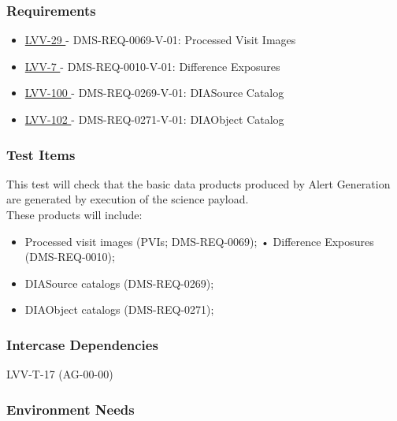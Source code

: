\subsubsection{Requirements}

\begin{itemize}

\item \href{https://jira.lsstcorp.org/browse/LVV-29}{ LVV-29 } - DMS-REQ-0069-V-01: Processed Visit Images

\item \href{https://jira.lsstcorp.org/browse/LVV-7}{ LVV-7 } - DMS-REQ-0010-V-01: Difference Exposures

\item \href{https://jira.lsstcorp.org/browse/LVV-100}{ LVV-100 } - DMS-REQ-0269-V-01: DIASource Catalog

\item \href{https://jira.lsstcorp.org/browse/LVV-102}{ LVV-102 } - DMS-REQ-0271-V-01: DIAObject Catalog

\end{itemize}


\subsubsection{Test Items}

This test will check that the basic data products produced by Alert
Generation are generated by execution of the science payload.\\
These products will include:

\begin{itemize}
\tightlist
\item
  Processed visit images (PVIs; DMS-REQ-0069); • Difference Exposures
  (DMS-REQ-0010);
\item
  DIASource catalogs (DMS-REQ-0269);
\item
  DIAObject catalogs (DMS-REQ-0271);
\end{itemize}





\subsubsection{Intercase Dependencies}

LVV-T-17 (AG-00-00)



\subsubsection{Environment Needs}

